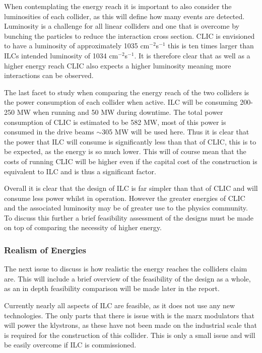 When contemplating the energy reach it is important to also consider the luminosities of each collider, as this will define how many events are detected. Luminosity is a challenge for all linear colliders and one that is overcome by bunching the particles to reduce the interaction cross section. CLIC is envisioned to have a luminosity of approximately 1035 cm$^{-2}$s$^{−1}$\cite{CLIC:Luminosity} this is ten times larger than ILCs intended luminosity of 1034 cm$^{-2}$s$^{−1}$\cite{IOP:ILC}. It is therefore clear that as well as a higher energy reach CLIC also expects a higher luminosity meaning more interactions can be observed.

The last facet to study when comparing the energy reach of the two colliders is the power consumption of each collider when active. ILC will be consuming 200-250 MW when running and 50 MW during downtime\cite{ILC:Director}. The total power consumption of CLIC is estimated to be 582 MW\cite{CLIC:Power}, most of this power is consumed in the drive beams $\sim$305 MW will be used here. Thus it is clear that the power that ILC will consume is significantly less than that of CLIC, this is to be expected, as the energy is so much lower. This will of course mean that the costs of running CLIC will be higher even if the capital cost of the construction is equivalent to ILC and is thus a significant factor.

Overall it is clear that the design of ILC is far simpler than that of CLIC and will consume less power whilst in operation. However the greater energies of CLIC and the associated luminosity may be of greater use to the physics community. To discuss this further a brief feasibility assessment of the designs must be made on top of comparing the necessity of higher energy.

\subsubsection{Realism of Energies}
The next issue to discuss is how realistic the energy reaches the colliders claim are. This will include a brief overview of the feasibility of the design as a whole, as an in depth feasibility comparison will be made later in the report.

Currently nearly all aspects of ILC are feasible, as it does not use any new technologies. The only parts that there is issue with is the marx modulators that will power the klystrons, as these have not been made on the industrial scale that is required for the construction of this collider\cite{ILC:ReferenceDesignReport}. This is only a small issue and will be easily overcome if ILC is commissioned.

